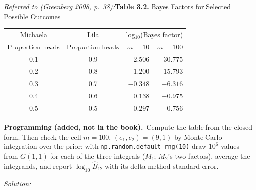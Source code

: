 \documentclass[11pt,a4paper]{article}
\newif\ifsolucoes
\newcommand{\espacoresol}{4.5cm}   %
\numberwithin{equation}{questao}   %
\newcommand{\programacao}{\par\smallskip\noindent\textbf{Programming (added, not in the book).}~}
\newcommand{\resolespaco}{\ifsolucoes\else\par\textit{Solution:}\vspace{\espacoresol}\par\fi}
\newcommand{\1}{\mathbf{1}}
\begin{document}
\begin{center}\small
\emph{Referred to (Greenberg 2008, p.~38):}\quad \textbf{Table 3.2.} Bayes Factors for Selected Possible Outcomes\\[2pt]
\begin{tabular}{ccrr}
\toprule
Michaela & Lila & \multicolumn{2}{c}{log$_{10}$(Bayes factor)}\\
Proportion heads & Proportion heads & $m=10$ & $m=100$\\
\midrule
0.1 & 0.9 & $-2.506$ & $-30.775$\\
0.2 & 0.8 & $-1.200$ & $-15.793$\\
0.3 & 0.7 & $-0.348$ & $-6.316$\\
0.4 & 0.6 & $0.138$ & $-0.975$\\
0.5 & 0.5 & $0.297$ & $0.756$\\
\bottomrule
\end{tabular}
\end{center}
\programacao Compute the table from the closed form. Then check the cell $m=100$, $(e_1,e_2)=(9,1)$
by Monte Carlo integration over the prior: with \texttt{np.random.default\_rng(10)} draw
$10^6$ values from $G(1,1)$ for each of the three integrals ($M_1$; $M_2$'s two factors), average
the integrands, and report $\log_{10}\hat B_{12}$ with its delta-method standard error.
\resolespaco
\end{document}
